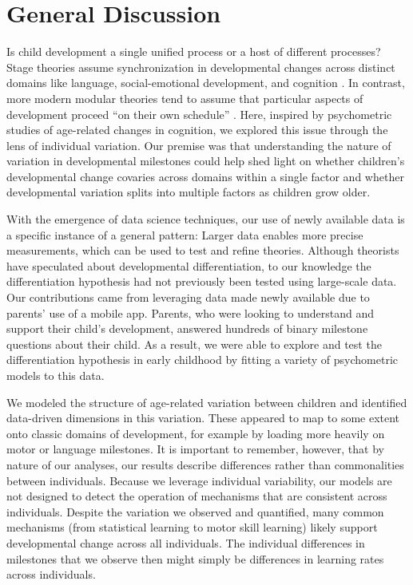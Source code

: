 \documentclass[man, floatsintext]{apa7}
\begin{document}
\section{General Discussion}\label{discussion}

Is child development a single uniﬁed process or a host of different
processes? Stage theories assume synchronization in developmental
changes across distinct domains like language, social-emotional
development, and cognition \parencite{flavell1963}. In contrast, more modern modular theories
tend to assume that particular aspects of development proceed ``on their
own schedule'' \parencite{spelke1992,sheldrick2019}. Here, inspired by psychometric studies of
age-related changes in cognition, we explored this issue through the lens of individual variation. Our premise was that
understanding the nature of variation in developmental milestones could help shed
light on whether children's developmental change covaries across domains
within a single factor and whether developmental variation splits into multiple factors as children grow older.

With the emergence of data science techniques, our use of newly
available data is a specific instance of a general pattern: Larger data
enables more precise measurements, which can be used to test and refine theories.
Although theorists have speculated about developmental differentiation,
to our knowledge the differentiation hypothesis had not previously been tested using large-scale
data. Our contributions came from leveraging data made newly available
due to parents' use of a mobile app. Parents, who were looking to understand and
support their child's development, answered hundreds of binary milestone
questions about their child. As a result, we were able to explore and
test the differentiation hypothesis in early childhood by fitting a
variety of psychometric models to this data.

We modeled the structure of age-related variation between children and identified data-driven dimensions in this variation. These appeared to map to some extent onto classic domains of development, for example by loading more heavily on motor or language milestones.
It is important to remember, however, that by nature of our analyses, our results describe differences rather than commonalities between individuals. Because we leverage individual variability, our models are not designed to detect the operation of mechanisms that are consistent across individuals. Despite the variation we observed and quantified,
many common mechanisms (from statistical learning to motor skill learning) likely support developmental change across all individuals. The individual differences in milestones that we observe then might simply be differences in  learning rates across individuals.
\end{document}
